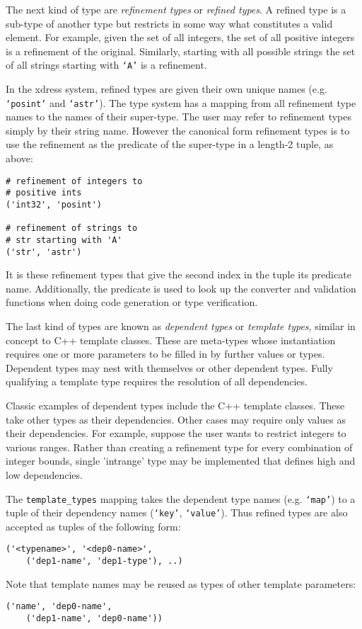 \documentclass{ansconfpaper}
\newcommand{\vin}[1]{\texttt{{#1}}}
\begin{document}
The next kind of type are \emph{refinement types} or \emph{refined types}.  
A refined type
is a sub-type of another type but restricts in some way what constitutes a valid 
element.  For example, given the set of all integers, the set of all positive 
integers is a refinement of the original.  Similarly, starting with all possible
strings the set of all strings starting with \vin{`A'} is a refinement.

In the xdress system, refined types are given their own unique names (e.g. 
\vin{`posint'} and \vin{`astr'}).  The type system has a mapping from all refinement
type names to the names of their super-type.  The user may refer to refinement types
simply by their string name.  However the canonical form refinement types is to use
the refinement as the predicate of the super-type in a length-2 tuple, as above:
\begin{lstlisting}
# refinement of integers to 
# positive ints
('int32', 'posint')

# refinement of strings to 
# str starting with 'A'
('str', 'astr')      
\end{lstlisting}
It is these refinement types that give the second index in the tuple its predicate
name.  Additionally, the predicate is used to look up the converter and validation
functions when doing code generation or type verification.

The last kind of types are known as \emph{dependent types} or \emph{template types}, 
similar in concept to C++ template classes.  These are meta-types whose 
instantiation requires one or more parameters to be filled in by further values or
types. Dependent types may nest with themselves or other dependent types.  Fully 
qualifying a template type requires the resolution of all dependencies.

Classic examples of dependent types include the C++ template classes.  These take
other types as their dependencies.  Other cases may require only values as 
their dependencies.  For example, suppose the user wants to restrict integers to 
various ranges.  Rather than creating a refinement type for every combination of 
integer bounds, single 'intrange' type may be implemented that defines high and low 
dependencies.

The \vin{template\_types} mapping takes the dependent type names (e.g. \vin{`map'})
to a tuple of their dependency names (\vin{`key'}, \vin{`value'}).   Thus 
refined types are also accepted as tuples of the following form:
\begin{lstlisting}
('<typename>', '<dep0-name>', 
    ('dep1-name', 'dep1-type'), ..)
\end{lstlisting}
Note that template names may be reused as types of other template parameters:
\begin{lstlisting}
('name', 'dep0-name', 
    ('dep1-name', 'dep0-name'))
\end{lstlisting}
\end{document}
